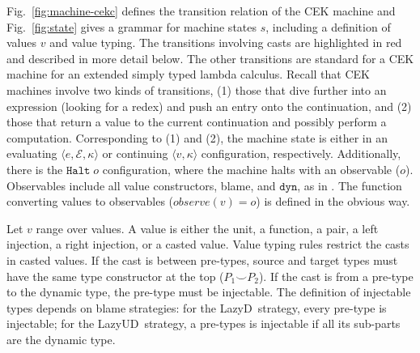 \documentclass[acmsmall,review]{acmart}\settopmatter{printfolios=true,printccs=false,printacmref=false}
\newcommand{\lazyUD}{Lazy\;UD}
\newcommand{\lazyD}{Lazy\;D}
\newcommand{\sOOinspect}[3]{\langle#1,#2,#3\rangle}
\newcommand{\sOOreturn}[2]{\langle#1,#2\rangle}
\newcommand{\sOOhalt}[1]{\mathtt{Halt} \; #1}
\newcommand{\oOOdyn}{\mathtt{dyn}}
\begin{document}
Fig.~\ref{fig:machine-cekc} defines the transition relation of the CEK
machine and Fig.~\ref{fig:state} gives a grammar for machine states
$s$, including a definition of values $v$ and value typing. 
The transitions involving casts are highlighted in red and described in
more detail below. The other transitions are standard for a CEK
machine for an extended simply typed lambda calculus.
%
Recall that CEK machines involve two kinds of transitions, (1) those
that dive further into an expression (looking for a redex) and push an
entry onto the continuation, and (2) those that return a value to the
current continuation and possibly perform a computation.
Corresponding to (1) and (2), the machine state is either in an evaluating
$\sOOinspect{e}{\mathcal{E}}{\kappa}$ or continuing $\sOOreturn{v}{\kappa}$ 
configuration, 
respectively. Additionally, there is the $\sOOhalt{o}$ configuration, where the 
machine halts with an observable ($o$). Observables include all value 
constructors, blame, and $\oOOdyn$, as in \citet{siek2012interpretations}. 
The function converting values to observables ($observe(v) = o$) is defined in 
the obvious way. 

Let $v$ range over values. A value is either the unit, a function, a pair, a 
left injection, a right injection, or a casted value. Value typing rules 
restrict the casts in casted values. If the cast is between pre-types, source 
and target types must have the same type constructor at the top ($P_1 \smile 
P_2$). If the cast is from a pre-type to the dynamic type, the pre-type must be 
injectable. The definition of injectable types depends on blame
strategies: for the \lazyD\ strategy, every pre-type is injectable;
for the \lazyUD\ strategy, a pre-types is injectable if all its sub-parts are 
the dynamic type.
\end{document}
